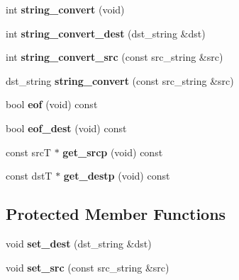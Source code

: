\begin{DoxyCompactItemize}
\item 
\hypertarget{class__IconvBase_a15ebe33d9db523d45b089bbd071defd0}{int {\bfseries string\-\_\-convert} (void)}\label{class__IconvBase_a15ebe33d9db523d45b089bbd071defd0}

\item 
\hypertarget{class__IconvBase_a8b4d9bff7f360968bfa1bb49c6090ec4}{int {\bfseries string\-\_\-convert\-\_\-dest} (dst\-\_\-string \&dst)}\label{class__IconvBase_a8b4d9bff7f360968bfa1bb49c6090ec4}

\item 
\hypertarget{class__IconvBase_a5aabb4b963aa3e2fa2b02f6cf7aa3b86}{int {\bfseries string\-\_\-convert\-\_\-src} (const src\-\_\-string \&src)}\label{class__IconvBase_a5aabb4b963aa3e2fa2b02f6cf7aa3b86}

\item 
\hypertarget{class__IconvBase_a46f70058431a83c02044a79c7ef52c35}{dst\-\_\-string {\bfseries string\-\_\-convert} (const src\-\_\-string \&src)}\label{class__IconvBase_a46f70058431a83c02044a79c7ef52c35}

\item 
\hypertarget{class__IconvBase_a1c05d5709f78c6d85a8f27126af7ab23}{bool {\bfseries eof} (void) const }\label{class__IconvBase_a1c05d5709f78c6d85a8f27126af7ab23}

\item 
\hypertarget{class__IconvBase_a5a7f48aae6aaf8812453fd04b777e173}{bool {\bfseries eof\-\_\-dest} (void) const }\label{class__IconvBase_a5a7f48aae6aaf8812453fd04b777e173}

\item 
\hypertarget{class__IconvBase_a6d79b9fbf4b0a7b626b4e108a886566a}{const src\-T $\ast$ {\bfseries get\-\_\-srcp} (void) const }\label{class__IconvBase_a6d79b9fbf4b0a7b626b4e108a886566a}

\item 
\hypertarget{class__IconvBase_a224ff7851493aa43f6fcee32a939d875}{const dst\-T $\ast$ {\bfseries get\-\_\-destp} (void) const }\label{class__IconvBase_a224ff7851493aa43f6fcee32a939d875}

\end{DoxyCompactItemize}
\subsection*{Protected Member Functions}
\begin{DoxyCompactItemize}
\item 
\hypertarget{class__IconvBase_af3d2f37c0dd5666cb0fec34b248d9106}{void {\bfseries set\-\_\-dest} (dst\-\_\-string \&dst)}\label{class__IconvBase_af3d2f37c0dd5666cb0fec34b248d9106}

\item 
\hypertarget{class__IconvBase_a30599161ba99c6a7b12e1a34f56fe1c8}{void {\bfseries set\-\_\-src} (const src\-\_\-string \&src)}\label{class__IconvBase_a30599161ba99c6a7b12e1a34f56fe1c8}

\end{DoxyCompactItemize}
